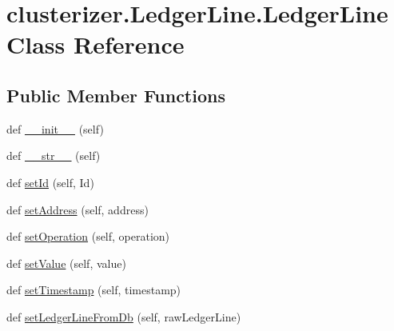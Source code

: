 \hypertarget{classclusterizer_1_1LedgerLine_1_1LedgerLine}{}\section{clusterizer.\+Ledger\+Line.\+Ledger\+Line Class Reference}
\label{classclusterizer_1_1LedgerLine_1_1LedgerLine}
\subsection*{Public Member Functions}
\begin{DoxyCompactItemize}
\item 
def \hyperlink{classclusterizer_1_1LedgerLine_1_1LedgerLine_a73464d06adbef7851dd5e6357366c4e3}{\+\_\+\+\_\+init\+\_\+\+\_\+} (self)
\item 
def \hyperlink{classclusterizer_1_1LedgerLine_1_1LedgerLine_abca2da84197f4fbd44d25e1db52e800e}{\+\_\+\+\_\+str\+\_\+\+\_\+} (self)
\item 
def \hyperlink{classclusterizer_1_1LedgerLine_1_1LedgerLine_a24340238ba60d11959dc0069169180e8}{set\+Id} (self, Id)
\item 
def \hyperlink{classclusterizer_1_1LedgerLine_1_1LedgerLine_a1c2bb79351030704e9fc7450a245e6be}{set\+Address} (self, address)
\item 
def \hyperlink{classclusterizer_1_1LedgerLine_1_1LedgerLine_a3b5ffe9294e2ccc312f581670d1d9955}{set\+Operation} (self, operation)
\item 
def \hyperlink{classclusterizer_1_1LedgerLine_1_1LedgerLine_a23fbcab6ca2c6cb12c1de48ddd478828}{set\+Value} (self, value)
\item 
def \hyperlink{classclusterizer_1_1LedgerLine_1_1LedgerLine_ab5b47b46be776b20e461c38a78d4dac9}{set\+Timestamp} (self, timestamp)
\item 
def \hyperlink{classclusterizer_1_1LedgerLine_1_1LedgerLine_a4e070da712c15bb02a8a78e927577ff4}{set\+Ledger\+Line\+From\+Db} (self, raw\+Ledger\+Line)
\end{DoxyCompactItemize}
